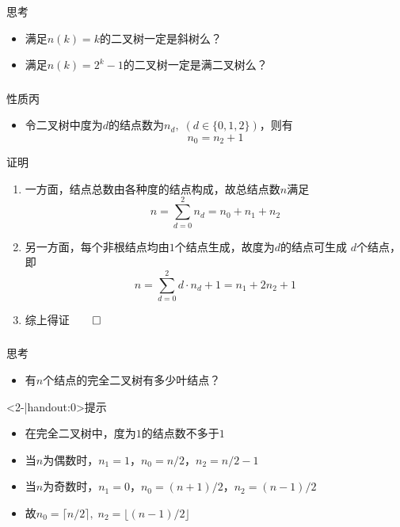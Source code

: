\begin{frame}
    \frametitle{\insertsubsectionhead}
    \begin{alertblock}{思考}
        \begin{itemize}
            \item 满足$n(k)=k$的二叉树一定是斜树么？
            \item 满足$n(k)=2^{k}-1$的二叉树一定是满二叉树么？
        \end{itemize}
    \end{alertblock}
\end{frame}

\begin{frame}
    \frametitle{\insertsubsectionhead}
    \begin{block}{性质丙}
        \begin{itemize}
            \item 令二叉树中度为$d$的结点数为$n_{d},\;(d\in\{0,1,2\})$，则有
                  \[
                        n_{0}=n_{2}+1
                  \]
        \end{itemize}
    \end{block}
    \pause
    \begin{exampleblock}{证明}
        \begin{enumerate}
            \item 一方面，结点总数由各种度的结点构成，故总结点数$n$满足
                  \[
                        n=\sum_{d=0}^{2}{n_{d}}=n_{0}+n_{1}+n_{2}
                  \]
            \item 另一方面，每个非根结点均由$1$个结点生成，故度为$d$的结点可生成
                  $d$个结点，即
                  \[
                        n=\sum_{d=0}^{2}{d\cdot{}n_{d}}+1=n_{1}+2n_{2}+1
                  \]
            \item 综上得证\hfill$\qed$
        \end{enumerate}
    \end{exampleblock}
\end{frame}

\begin{frame}
    \frametitle{\insertsubsectionhead}
    \begin{alertblock}{思考}
        \begin{itemize}
            \item 有$n$个结点的完全二叉树有多少叶结点？
        \end{itemize}
    \end{alertblock}
    \pause
    \begin{exampleblock}<2-|handout:0>{提示}
        \begin{itemize}
            \item 在完全二叉树中，度为$1$的结点数不多于$1$
            \item 当$n$为偶数时，$n_{1}=1$，$n_{0}=n/2$，$n_{2}=n/2-1$
            \item 当$n$为奇数时，$n_{1}=0$，$n_{0}=(n+1)/2$，$n_{2}=(n-1)/2$
            \item 故$n_{0}=\lceil{n/2}\rceil,\;n_{2}=\lfloor{(n-1)/2}\rfloor$
        \end{itemize}
    \end{exampleblock}
\end{frame}

